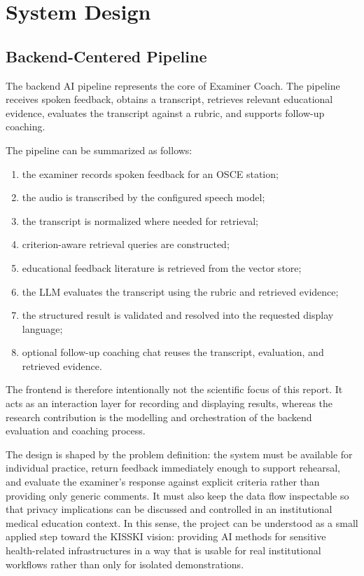 \section{System Design}

\subsection{Backend-Centered Pipeline}
The backend AI pipeline represents the core of Examiner Coach. The pipeline receives spoken
feedback, obtains a transcript, retrieves relevant educational evidence,
evaluates the transcript against a rubric, and supports follow-up coaching.

The pipeline can be summarized as follows:
\begin{enumerate}
    \item the examiner records spoken feedback for an OSCE station;
    \item the audio is transcribed by the configured speech model;
    \item the transcript is normalized where needed for retrieval;
    \item criterion-aware retrieval queries are constructed;
    \item educational feedback literature is retrieved from the vector store;
    \item the LLM evaluates the transcript using the rubric and retrieved
    evidence;
    \item the structured result is validated and resolved into the requested
    display language;
    \item optional follow-up coaching chat reuses the transcript, evaluation, and
    retrieved evidence.
\end{enumerate}

The frontend is therefore intentionally not the scientific focus of this
report. It acts as an interaction layer for recording and displaying results,
whereas the research contribution is the modelling and orchestration of the
backend evaluation and coaching process.

The design is shaped by the problem definition: the system must be available for
individual practice, return feedback immediately enough to support rehearsal,
and evaluate the examiner's response against explicit criteria rather than
providing only generic comments. It must also keep the data flow inspectable so
that privacy implications can be discussed and controlled in an institutional
medical education context. In this sense, the project can be understood as a
small applied step toward the KISSKI vision: providing AI methods for sensitive
health-related infrastructures in a way that is usable for real institutional
workflows rather than only for isolated demonstrations.

